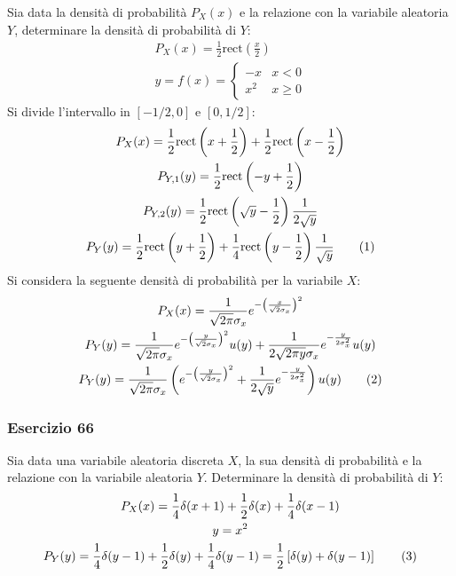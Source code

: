\documentclass{article}
\newcommand{\rect}{\mathrm{rect}}
\newcommand{\tageq}{\tag{\stepcounter{equation}\theequation}}
\begin{document}
Sia data la densità di probabilità $P_X(x)$ e la relazione con la variabile aleatoria $Y$, determinare la densità di probabilità di $Y$:
\begin{gather*}
    P_X(x)=\displaystyle\frac{1}{2}\rect\left(\frac{x}{2}\right)\\
    y=f(x)=\begin{cases}
        -x&x<0\\
        x^2&x\geq 0
    \end{cases}
\end{gather*}
Si divide l'intervallo in $[-1/2,0]$ e $[0,1/2]$:
\begin{gather*}
    P_X(x)=\displaystyle\frac{1}{2}\rect\left(x+\frac{1}{2}\right)+\frac{1}{2}\rect\left(x-\frac{1}{2}\right)\\
    P_{Y,1}(y)=\displaystyle\frac{1}{2}\rect\left(-y+\frac{1}{2}\right)\\
    P_{Y,2}(y)=\displaystyle\frac{1}{2}\rect\left(\sqrt{y}-\frac{1}{2}\right)\frac{1}{2\sqrt{y}}\\
    P_Y(y)=\displaystyle\frac{1}{2}\rect\left(y+\frac{1}{2}\right)+\frac{1}{4}\rect\left(y-\frac{1}{2}\right)\frac{1}{\sqrt{y}}\tageq
\end{gather*}
Si considera la seguente densità di probabilità per la variabile $X$:
\begin{gather*}
    P_X(x)=\displaystyle\frac{1}{\sqrt{2\pi}\sigma_x}e^{-\left(\frac{x}{\sqrt2\sigma_x}\right)^2}\\
    P_Y(y)=\displaystyle\frac{1}{\sqrt{2\pi}\sigma_x}e^{-\left(\frac{y}{\sqrt2\sigma_x}\right)^2}u(y)+\frac{1}{2\sqrt{2\pi y} \sigma_x}e^{-\frac{y}{2\sigma_x^2}}u(y)\\
    P_Y(y)=\displaystyle\frac{1}{\sqrt{2\pi}\sigma_x}\left(e^{-\left(\frac{y}{\sqrt2\sigma_x}\right)^2}+\frac{1}{2\sqrt{y}}e^{-\frac{y}{2\sigma_x^2}}\right)u(y)\tageq
\end{gather*}

\subsubsection*{Esercizio 66}

Sia data una variabile aleatoria discreta $X$, la sua densità di probabilità e la relazione con la variabile aleatoria $Y$. Determinare la densità di probabilità di $Y$:
\begin{gather*}
    P_X(x)=\displaystyle\frac{1}{4}\delta(x+1)+\frac{1}{2}\delta(x)+\frac{1}{4}\delta(x-1)\\
    y=x^2\\
    P_Y(y)=\displaystyle\frac{1}{4}\delta(y-1)+\frac{1}{2}\delta(y)+\frac{1}{4}\delta(y-1)=\frac{1}{2}\left[\delta(y)+\delta(y-1)\right]\tageq
\end{gather*}
\end{document}
